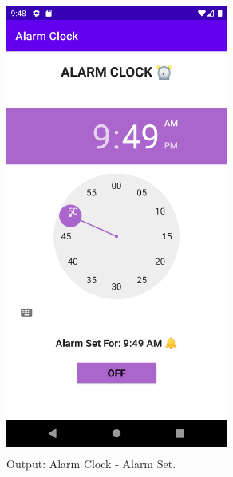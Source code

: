 \documentclass[12pt, a4]{article}
\begin{document}
\newpage
\subsection*{}
\begin{figure}[h]
\centering
\caption{Output: Alarm Clock - Alarm Set.}
\includegraphics[height=15cm, width=7.3cm]{AlarmClock/Screenshots/Output-2.png}
\end{figure}

\newpage
\end{document}
